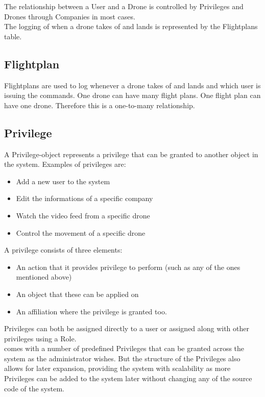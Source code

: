 The relationship between a User and a Drone is controlled by Privileges and Drones through Companies in most cases. \\

The logging of when a drone takes of and lands is represented by the Flightplans table.


\subsection{Flightplan}
Flightplans are used to log whenever a drone takes of and lands and which user is issuing the commands.
One drone can have many flight plans.
One flight plan can have one drone.
Therefore this is a one-to-many relationship.


\subsection{Privilege}
\label{sec:privileges}
A Privilege-object represents a privilege that can be granted to another object in the system.
Examples of privileges are:

\begin{itemize}
    \item Add a new user to the system
    \item Edit the informations of a specific company
    \item Watch the video feed from a specific drone
    \item Control the movement of a specific drone
\end{itemize}

A privilege consists of three elements:

\begin{itemize}
    \item An action that it provides privilege to perform (such as any of the ones mentioned above)
    \item An object that these can be applied on
    \item An affiliation where the privilege is granted too.
\end{itemize}

Privileges can both be assigned directly to a user or assigned along with other privileges using a Role. \\

\projectname{} comes with a number of predefined Privileges that can be granted across the system as the administrator wishes.
But the structure of the Privileges also allows for later expansion, providing the system with scalability as more Privileges can be added to the system later without changing any of the source code of the system.


